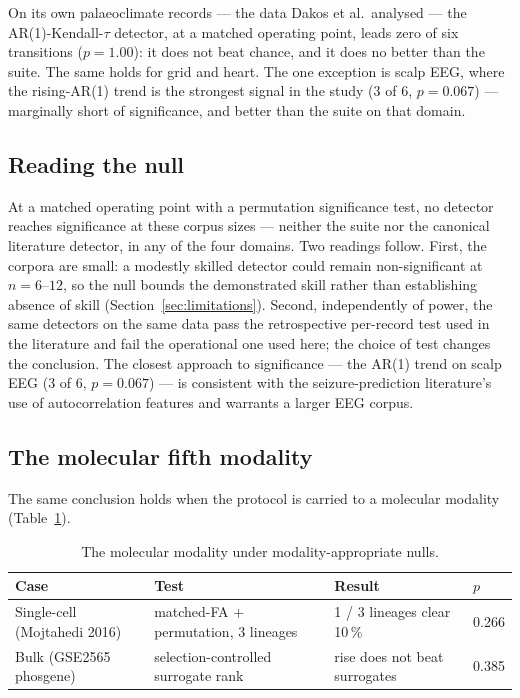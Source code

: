 \documentclass[aip,cha,preprint,amsmath,amssymb]{revtex4-2}
\begin{document}
On its own palaeoclimate records --- the data Dakos et al.\ analysed
--- the AR(1)-Kendall-$\tau$ detector, at a matched operating point,
leads zero of six transitions ($p = 1.00$): it does not beat chance,
and it does no better than the suite. The same holds for grid and
heart. The one exception is scalp EEG, where the rising-AR(1) trend is
the strongest signal in the study (3 of 6, $p = 0.067$) --- marginally
short of significance, and better than the suite on that domain.

\subsection{Reading the null}\label{sec:reading}

At a matched operating point with a permutation significance test, no
detector reaches significance at these corpus sizes --- neither the
suite nor the canonical literature detector, in any of the four
domains. Two readings follow. First, the corpora are small: a modestly
skilled detector could remain non-significant at $n = 6$--$12$, so the
null bounds the demonstrated skill rather than establishing absence of
skill (Section~\ref{sec:limitations}). Second, independently of power,
the same detectors on the same data pass the retrospective per-record
test used in the literature and fail the operational one used here; the
choice of test changes the conclusion. The closest approach to
significance --- the AR(1) trend on scalp EEG (3 of 6, $p = 0.067$) ---
is consistent with the seizure-prediction literature's use of
autocorrelation features and warrants a larger EEG corpus.

\subsection{The molecular fifth modality}\label{sec:dnb}

The same conclusion holds when the protocol is carried to a molecular
modality (Table~\ref{tab:dnb}).

\begin{table}[h!]
\centering
\scriptsize
\setlength{\tabcolsep}{3pt}
\begin{tabular}{llll}
\toprule
Case & Test & Result & $p$ \\
\midrule
Single-cell (Mojtahedi 2016) & matched-FA + permutation, 3 lineages & 1 / 3 lineages clear 10\,\% & 0.266 \\
Bulk (GSE2565 phosgene) & selection-controlled surrogate rank & rise does not beat surrogates & 0.385 \\
\bottomrule
\end{tabular}
\caption{The molecular modality under modality-appropriate nulls.}
\label{tab:dnb}
\end{table}
\end{document}
